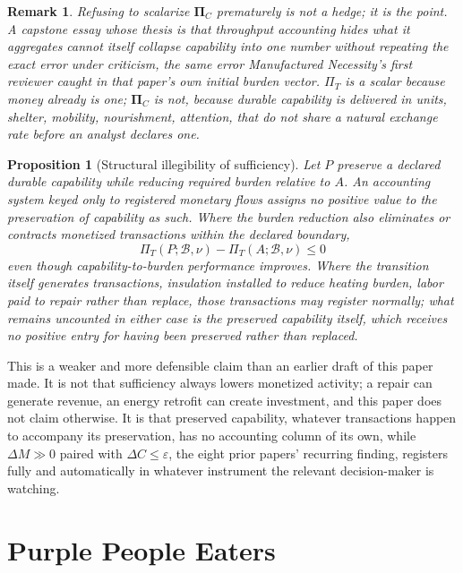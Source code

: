 \documentclass[11pt]{article}
\newtheorem{proposition}[definition]{Proposition}
\newtheorem{remark}[definition]{Remark}
\begin{document}
\begin{remark}
Refusing to scalarize $\boldsymbol{\Pi}_C$ prematurely is not a hedge; it is the point. A capstone essay whose thesis is that throughput accounting hides what it aggregates cannot itself collapse capability into one number without repeating the exact error under criticism, the same error \emph{Manufactured Necessity}'s first reviewer caught in that paper's own initial burden vector. $\Pi_T$ is a scalar because money already is one; $\boldsymbol{\Pi}_C$ is not, because durable capability is delivered in units, shelter, mobility, nourishment, attention, that do not share a natural exchange rate before an analyst declares one.
\end{remark}

\begin{proposition}[Structural illegibility of sufficiency]
Let $P$ preserve a declared durable capability while reducing required burden relative to $A$. An accounting system keyed only to registered monetary flows assigns no positive value to the preservation of capability as such. Where the burden reduction also eliminates or contracts monetized transactions within the declared boundary,
\[
\Pi_T(P; \mathcal{B}, \nu) - \Pi_T(A; \mathcal{B}, \nu) \leq 0
\]
even though capability-to-burden performance improves. Where the transition itself generates transactions, insulation installed to reduce heating burden, labor paid to repair rather than replace, those transactions may register normally; what remains uncounted in either case is the preserved capability itself, which receives no positive entry for having been preserved rather than replaced.
\end{proposition}

This is a weaker and more defensible claim than an earlier draft of this paper made. It is not that sufficiency always lowers monetized activity; a repair can generate revenue, an energy retrofit can create investment, and this paper does not claim otherwise. It is that preserved capability, whatever transactions happen to accompany its preservation, has no accounting column of its own, while $\Delta M \gg 0$ paired with $\Delta C \leq \varepsilon$, the eight prior papers' recurring finding, registers fully and automatically in whatever instrument the relevant decision-maker is watching.

\section{Purple People Eaters}
\end{document}
